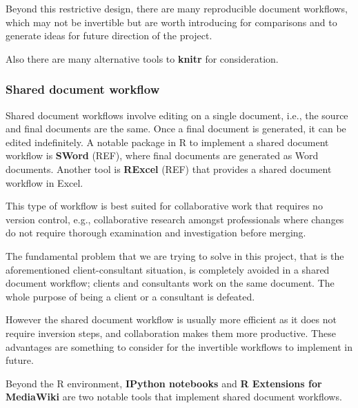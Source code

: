 \documentclass[a4paper, 12pt]{report}
\begin{document}
Beyond this restrictive design, there are many reproducible document workflows, which may not be invertible but are worth introducing for comparisons and to generate ideas for future direction of the project.

Also there are many alternative tools to \textbf{knitr} for consideration.


\subsubsection*{Shared document workflow}
\begin{figure}[h!]
\centering
\end{figure}

Shared document workflows involve editing on a single document, i.e., the source and final documents are the same. Once a final document is generated, it can be edited indefinitely. A notable package in R to implement a shared document workflow is \textbf{SWord} (REF), where final documents are generated as Word documents. Another tool is \textbf{RExcel} (REF) that provides a shared document workflow in Excel.

This type of workflow is best suited for collaborative work that requires no version control, e.g., collaborative research amongst professionals where changes do not require thorough examination and investigation before merging.

The fundamental problem that we are trying to solve in this project, that is the aforementioned client-consultant situation, is completely avoided in a shared document workflow; clients and consultants work on the same document. The whole purpose of being a client or a consultant is defeated.

However the shared document workflow is usually more efficient as it does not require inversion steps, and collaboration makes them more productive. These advantages are something to consider for the invertible workflows to implement in future.

Beyond the R environment, \textbf{IPython notebooks} \citep{ipython} and \textbf{R Extensions for MediaWiki} \citep{rextension} are two notable tools that implement shared document workflows.
\end{document}
